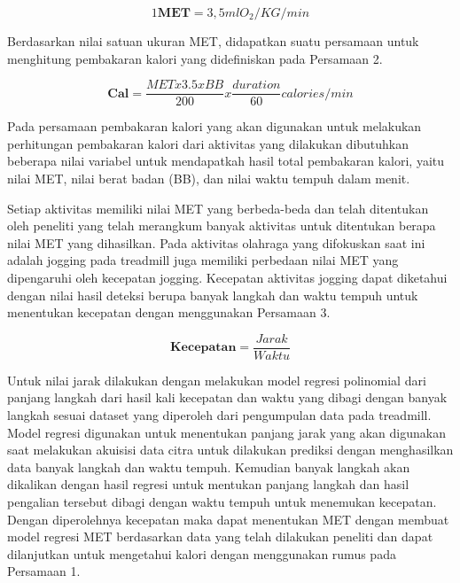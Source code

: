 \begin{equation}
  \label{eq:SatuanMET}
  1 \mathbf{MET} = 3,5 ml O_2  / KG / min
\end{equation}

Berdasarkan nilai satuan ukuran MET, didapatkan suatu persamaan untuk menghitung pembakaran kalori yang didefiniskan pada Persamaan 2.

\begin{equation}
  \label{eq:RumusKalori}
  \mathbf{Cal} = \frac{MET x 3.5 x BB}{200} x \frac{duration}{60} calories / min
\end{equation}

Pada persamaan pembakaran kalori yang akan digunakan untuk melakukan perhitungan pembakaran kalori dari aktivitas yang dilakukan dibutuhkan beberapa nilai variabel untuk mendapatkah hasil total pembakaran kalori, yaitu nilai MET, nilai berat badan (BB), dan nilai waktu tempuh dalam menit.

Setiap aktivitas memiliki nilai MET yang berbeda-beda dan telah ditentukan oleh peneliti yang telah merangkum banyak aktivitas untuk ditentukan berapa nilai MET yang dihasilkan. Pada aktivitas olahraga yang difokuskan saat ini adalah jogging pada treadmill juga memiliki perbedaan nilai MET yang dipengaruhi oleh kecepatan jogging. Kecepatan aktivitas jogging dapat diketahui dengan nilai hasil deteksi berupa banyak langkah dan waktu tempuh untuk menentukan kecepatan dengan menggunakan Persamaan 3.

\begin{equation}
  \label{eq:RumusKecepatan}
  \mathbf{Kecepatan} = \frac{Jarak}{Waktu}
\end{equation}

Untuk nilai jarak dilakukan dengan melakukan model regresi polinomial dari panjang langkah dari hasil kali kecepatan dan waktu yang dibagi dengan banyak langkah sesuai dataset yang diperoleh dari pengumpulan data pada treadmill. Model regresi digunakan untuk menentukan panjang jarak yang akan digunakan saat melakukan akuisisi data citra untuk dilakukan prediksi dengan menghasilkan data banyak langkah dan waktu tempuh. Kemudian banyak langkah akan dikalikan dengan hasil regresi untuk mentukan panjang langkah dan hasil pengalian tersebut dibagi dengan waktu tempuh untuk menemukan kecepatan. Dengan diperolehnya kecepatan maka dapat menentukan MET dengan membuat model regresi MET berdasarkan data yang telah dilakukan peneliti dan dapat dilanjutkan untuk mengetahui kalori dengan menggunakan rumus pada Persamaan 1.
